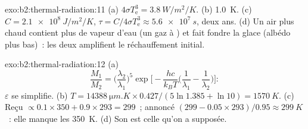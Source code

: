 \begin{solution}{exo:b2:thermal-radiation:11}
(a) $4\sigma T_{\text{e}}^3 = \qty{3.8}{W/m^2/K}$. (b) \qty{1.0}{K}. (c) $C =
\qty{2.1e8}{J/m^2/K}$, $\tau = C/4\sigma T_{\text{e}}^3 \approx \qty{5.6e7}{s}$, deux
ans. (d) Un air plus chaud contient plus de vapeur d'eau (un gaz à ) et
fait fondre la glace (albédo plus bas)~: les deux amplifient le réchauffement initial.
\end{solution}

\begin{solution}{exo:b2:thermal-radiation:12}
(a)
\[
\frac{M_1}{M_2} = \Big(\frac{\lambda_2}{\lambda_1}\Big)^5\exp\Big[-\frac{hc}{k_BT}\Big(\frac{1}{\lambda_1} - \frac{1}{\lambda_2}\Big)\Big] :
\]
$\varepsilon$ se simplifie. (b) $T = \qty{14388}{\micro m.K} \times 0.427/(5\ln 1.385 +
\ln 10) = \qty{1570}{K}$. (c) Reçu $\propto 0.1 \times 350 + 0.9 \times 293 =
299$~; annoncé $(299 - 0.05 \times 293)/0.95 \approx \qty{299}{K}$~: elle manque les
\qty{350}{K}. (d) Son  est celle qu'on a supposée.
\end{solution}

